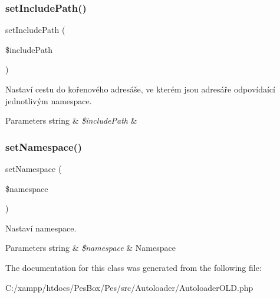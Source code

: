 \subsubsection{\texorpdfstring{set\+Include\+Path()}{setIncludePath()}}
{\footnotesize\ttfamily set\+Include\+Path (\begin{DoxyParamCaption}\item[{}]{\$include\+Path }\end{DoxyParamCaption})}

Nastaví cestu do kořenového adresáše, ve kterém jsou adresáře odpovídaící jednotlivým namespace. 
\begin{DoxyParams}[1]{Parameters}
string & {\em \$include\+Path} & \\
\hline
\end{DoxyParams}
\mbox{\label{class_autoloader___autoloader_o_l_d_a37949ed2c12b42fb654edc1bac8569ba}} 
\subsubsection{\texorpdfstring{set\+Namespace()}{setNamespace()}}
{\footnotesize\ttfamily set\+Namespace (\begin{DoxyParamCaption}\item[{}]{\$namespace }\end{DoxyParamCaption})}

Nastaví namespace. 
\begin{DoxyParams}[1]{Parameters}
string & {\em \$namespace} & Namespace \\
\hline
\end{DoxyParams}


The documentation for this class was generated from the following file\+:\begin{DoxyCompactItemize}
\item 
C\+:/xampp/htdocs/\+Pes\+Box/\+Pes/src/\+Autoloader/Autoloader\+O\+L\+D.\+php\end{DoxyCompactItemize}
